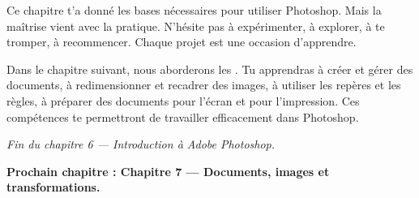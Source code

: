 Ce chapitre t'a donné les bases nécessaires pour utiliser Photoshop. Mais la maîtrise vient avec la pratique. N'hésite pas à expérimenter, à explorer, à te tromper, à recommencer. Chaque projet est une occasion d'apprendre.

Dans le chapitre suivant, nous aborderons les . Tu apprendras à créer et gérer des documents, à redimensionner et recadrer des images, à utiliser les repères et les règles, à préparer des documents pour l'écran et pour l'impression. Ces compétences te permettront de travailler efficacement dans Photoshop.

\vspace{2em}

\begin{center}
\textit{Fin du chapitre 6 --- Introduction à Adobe Photoshop.}

\vspace{1em}

\textbf{Prochain chapitre : Chapitre 7 --- Documents, images et transformations.}
\end{center}


